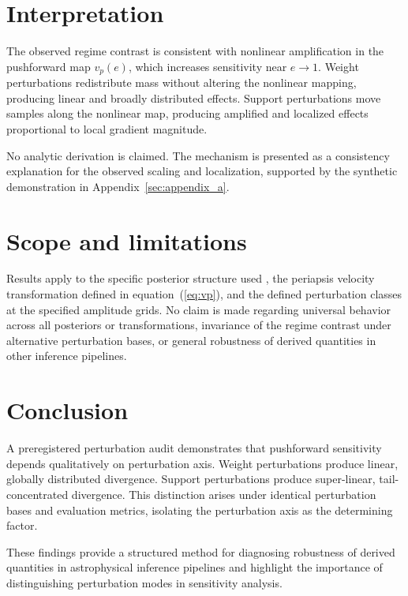 \documentclass[a4paper,fleqn,usenatbib]{mnras}
\begin{document}
\section{Interpretation}
\label{sec:interpretation}

The observed regime contrast is consistent with nonlinear amplification in the
pushforward map $v_p(e)$, which increases sensitivity near $e \to 1$. Weight
perturbations redistribute mass without altering the nonlinear mapping,
producing linear and broadly distributed effects. Support perturbations move
samples along the nonlinear map, producing amplified and localized effects
proportional to local gradient magnitude.

No analytic derivation is claimed. The mechanism is presented as a consistency
explanation for the observed scaling and localization, supported by the
synthetic demonstration in Appendix~\ref{sec:appendix_a}.

\section{Scope and limitations}
\label{sec:scope}

Results apply to the specific posterior structure used \citep{Do2019}, the
periapsis velocity transformation defined in equation~(\ref{eq:vp}), and the
defined perturbation classes at the specified amplitude grids. No claim is made
regarding universal behavior across all posteriors or transformations,
invariance of the regime contrast under alternative perturbation bases, or
general robustness of derived quantities in other inference pipelines.

\section{Conclusion}
\label{sec:conclusion}

A preregistered perturbation audit demonstrates that pushforward sensitivity
depends qualitatively on perturbation axis. Weight perturbations produce
linear, globally distributed divergence. Support perturbations produce
super-linear, tail-concentrated divergence. This distinction arises under
identical perturbation bases and evaluation metrics, isolating the perturbation
axis as the determining factor.

These findings provide a structured method for diagnosing robustness of derived
quantities in astrophysical inference pipelines and highlight the importance of
distinguishing perturbation modes in sensitivity analysis.
\end{document}
